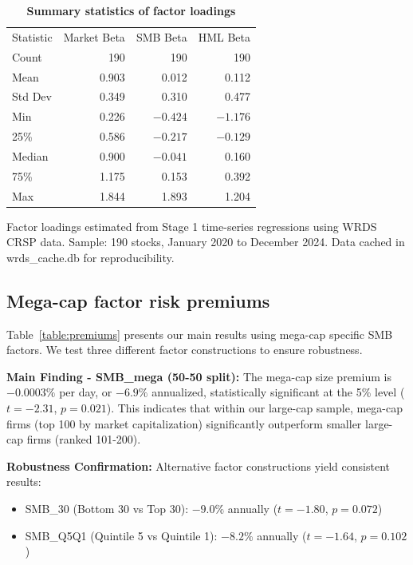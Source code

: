 \documentclass[10pt,letterpaper]{article}
\newlength\savedwidth
\newcommand\thickhline{\noalign{\global\savedwidth\arrayrulewidth\global\arrayrulewidth 2pt}%
\hline
\noalign{\global\arrayrulewidth\savedwidth}}
\begin{document}
\begin{table}[!htbp]
\centering
\caption{\textbf{Summary statistics of factor loadings}}
\begin{tabular}{lrrr}
\hline
Statistic & Market Beta & SMB Beta & HML Beta \\
\thickhline
Count & 190 & 190 & 190 \\
Mean & 0.903 & 0.012 & 0.112 \\
Std Dev & 0.349 & 0.310 & 0.477 \\
Min & 0.226 & $-0.424$ & $-1.176$ \\
25\% & 0.586 & $-0.217$ & $-0.129$ \\
Median & 0.900 & $-0.041$ & 0.160 \\
75\% & 1.175 & 0.153 & 0.392 \\
Max & 1.844 & 1.893 & 1.204 \\
\hline
\end{tabular}
\begin{flushleft}
Factor loadings estimated from Stage 1 time-series regressions using WRDS CRSP data. Sample: 190 stocks, January 2020 to December 2024. Data cached in wrds\_cache.db for reproducibility.
\end{flushleft}
\label{table:betas}
\end{table}

\subsection*{Mega-cap factor risk premiums}

Table~\ref{table:premiums} presents our main results using mega-cap specific SMB factors. We test three different factor constructions to ensure robustness.

\textbf{Main Finding - SMB\_mega (50-50 split):} The mega-cap size premium is $-0.0003\%$ per day, or $-6.9\%$ annualized, statistically significant at the 5\% level ($t=-2.31$, $p=0.021$). This indicates that within our large-cap sample, mega-cap firms (top 100 by market capitalization) significantly outperform smaller large-cap firms (ranked 101-200).

\textbf{Robustness Confirmation:} Alternative factor constructions yield consistent results:
\begin{itemize}
\item SMB\_30 (Bottom 30 vs Top 30): $-9.0\%$ annually ($t=-1.80$, $p=0.072$)
\item SMB\_Q5Q1 (Quintile 5 vs Quintile 1): $-8.2\%$ annually ($t=-1.64$, $p=0.102$)
\end{itemize}
\end{document}
